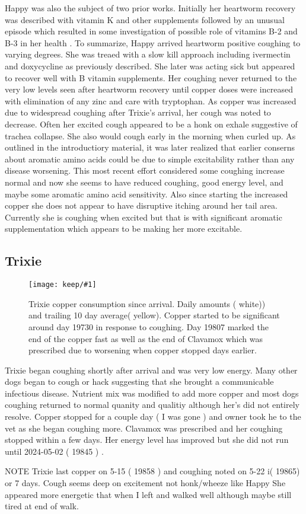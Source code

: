\documentclass[aps,secnumarabic,balancelastpage,amsmath,amssymb,nofootinbib]{revtex4}
\newlength{\fullfigwidth}  \setlength{\fullfigwidth}{.8\textwidth }
\newcommand{\mjmfullplot}[1]{\texttt{[image: keep/\#1]}}
\newcommand{\mjmtrixiecu}{
\begin{figure}[htb] 
\centering
\mjmfullplot{trixie_cu.jpg}
\caption{   Trixie copper consumption since arrival. Daily amounts
( white)) and trailing 10 day average( yellow). Copper started to
be significant around day 19730 in response to coughing. Day 19807
marked the end of the copper fast as well as the end of Clavamox
which was prescribed due to worsening when copper stopped days
earlier. 
  }
\end{figure}
} %
\begin{document}
Happy was also the subject of two prior works.
Initially her heartworm recovery was described
with vitamin K and other supplements
\cite{mmarchywka-MJM-2019-001-.1li}
followed by an unusual episode which resulted in some
investigation of possible role of vitamins B-2 and B-3
in her health
\cite{marchywka-MJM-2022-009-0.50rg}
.
To summarize, Happy arrived heartworm positive coughing to varying degrees.
She was treaed with a slow kill approach including ivermectin
and doxycycline as previously described. She later was acting
sick but appeared to recover well with B vitamin supplements.
Her coughing never returned to the very low levels
seen after heartworm recovery until copper doses were increased
with elimination of any zinc and care with tryptophan.
As copper was increased due to widespread coughing after Trixie's
arrival, her cough was noted to decrease.
Often her excited cough appeared to be a honk on exhale suggestive of
trachea collapse. She also would cough early in the morning
when curled up. 
As outlined in the introductiory material, it was later realized 
that earlier conserns about aromatic amino acids could be
due to simple excitability rather than any disease worsening.
This most recent effort considered some coughing increase normal
and now she seems to have reduced coughing, good energy level,
and maybe some  aromatic amino acid sensitivity. 
Also since starting the increased copper she does not appear to
have disruptive itching around her tail area. Currently
she is coughing when excited but that is with significant
aromatic supplementation which appears to be making her more
excitable.  

\subsection{Trixie}

\mjmtrixiecu

Trixie began coughing shortly after arrival and was
very low energy. Many other dogs began to cough or
hack suggesting that she brought a communicable infectious
disease. Nutrient mix was modified to add more copper and
most dogs coughing returned to normal quanity and qualitiy
although her's did not entirely resolve. Copper stopped for a couple
day ( I was gone ) and owner took he to the vet as she
began coughing more. Clavamox was prescribed and her coughing
stopped within a few days. Her energy level has improved
but she did not  run until 2024-05-02 ( 19845 ) .  

 NOTE Trixie last copper on 5-15 ( 19858 )  and coughing noted on 5-22 i( 19865) or 7 days. Cough seems deep on excitement not honk/wheeze like Happy  
She appeared more energetic that when I left and walked well
although maybe still tired at end of walk. 
\end{document}
